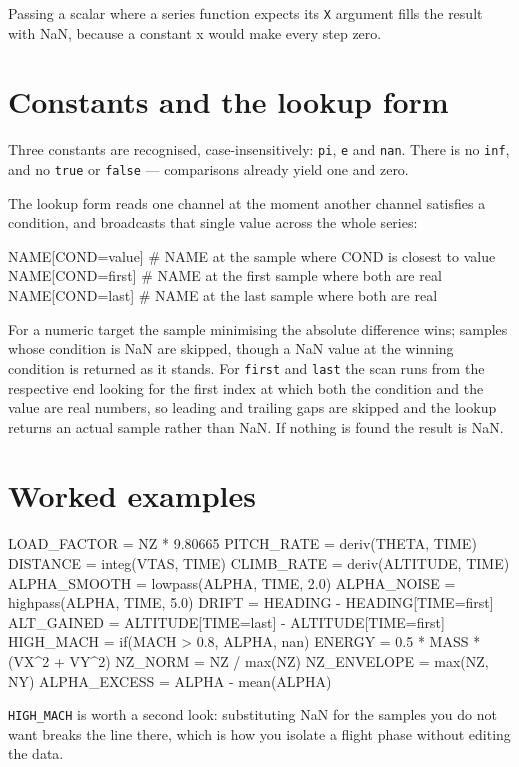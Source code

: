 \documentclass[11pt,a4paper,oneside]{report}
\newcommand{\code}[1]{\texttt{#1}}
\begin{document}
Passing a scalar where a series function expects its \code{X} argument fills the
result with NaN, because a constant x would make every step zero.

\section{Constants and the lookup form}

Three constants are recognised, case-insensitively: \code{pi}, \code{e} and
\code{nan}. There is no \code{inf}, and no \code{true} or \code{false} ---
comparisons already yield one and zero.

The lookup form reads one channel at the moment another channel satisfies a
condition, and broadcasts that single value across the whole series:

\begin{aoecode}
NAME[COND=value]    # NAME at the sample where COND is closest to value
NAME[COND=first]    # NAME at the first sample where both are real
NAME[COND=last]     # NAME at the last sample where both are real
\end{aoecode}

For a numeric target the sample minimising the absolute difference wins; samples
whose condition is NaN are skipped, though a NaN value at the winning condition
is returned as it stands. For \code{first} and \code{last} the scan runs from the
respective end looking for the first index at which both the condition and the
value are real numbers, so leading and trailing gaps are skipped and the lookup
returns an actual sample rather than NaN. If nothing is found the result is NaN.

\section{Worked examples}

\begin{aoecode}
LOAD_FACTOR  = NZ * 9.80665
PITCH_RATE   = deriv(THETA, TIME)
DISTANCE     = integ(VTAS, TIME)
CLIMB_RATE   = deriv(ALTITUDE, TIME)
ALPHA_SMOOTH = lowpass(ALPHA, TIME, 2.0)
ALPHA_NOISE  = highpass(ALPHA, TIME, 5.0)
DRIFT        = HEADING - HEADING[TIME=first]
ALT_GAINED   = ALTITUDE[TIME=last] - ALTITUDE[TIME=first]
HIGH_MACH    = if(MACH > 0.8, ALPHA, nan)
ENERGY       = 0.5 * MASS * (VX^2 + VY^2)
NZ_NORM      = NZ / max(NZ)
NZ_ENVELOPE  = max(NZ, NY)
ALPHA_EXCESS = ALPHA - mean(ALPHA)
\end{aoecode}

\code{HIGH\_MACH} is worth a second look: substituting NaN for the samples you do
not want breaks the line there, which is how you isolate a flight phase without
editing the data.
\end{document}

